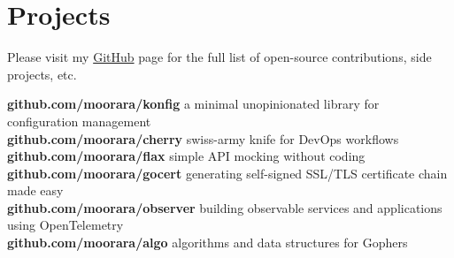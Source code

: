 \documentclass[]{cv-style}                     %
\begin{document}
\section{Projects}

Please visit my \href{http://github.com/moorara}{GitHub} page for the full list of open-source contributions, side projects, etc.

\textbf{github.com/moorara/konfig} a minimal unopinionated library for configuration management  \\
\textbf{github.com/moorara/cherry} swiss-army knife for DevOps workflows  \\
\textbf{github.com/moorara/flax} simple API mocking without coding  \\
\textbf{github.com/moorara/gocert} generating self-signed SSL/TLS certificate chain made easy \\
\textbf{github.com/moorara/observer} building observable services and applications using OpenTelemetry \\
\textbf{github.com/moorara/algo} algorithms and data structures for Gophers \\

\begin{entrylist}



\end{entrylist}



\end{document}
